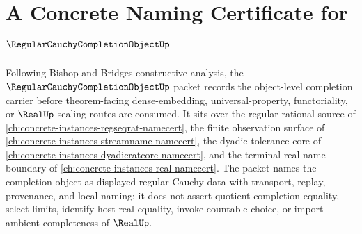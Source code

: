 \chapter{A Concrete Naming Certificate for $\RegularCauchyCompletionObjectUp$}
\label{ch:concrete-instances-regular-cauchy-completion-object-namecert}

Following Bishop and Bridges constructive analysis, the $\RegularCauchyCompletionObjectUp$ packet records the object-level completion carrier before theorem-facing dense-embedding, universal-property, functoriality, or $\RealUp$ sealing routes are consumed. It sits over the regular rational source of \autoref{ch:concrete-instances-regseqrat-namecert}, the finite observation surface of \autoref{ch:concrete-instances-streamname-namecert}, the dyadic tolerance core of \autoref{ch:concrete-instances-dyadicratcore-namecert}, and the terminal real-name boundary of \autoref{ch:concrete-instances-real-namecert}. The packet names the completion object as displayed regular Cauchy data with transport, replay, provenance, and local naming; it does not assert quotient completion equality, select limits, identify host real equality, invoke countable choice, or import ambient completeness of $\RealUp$.

